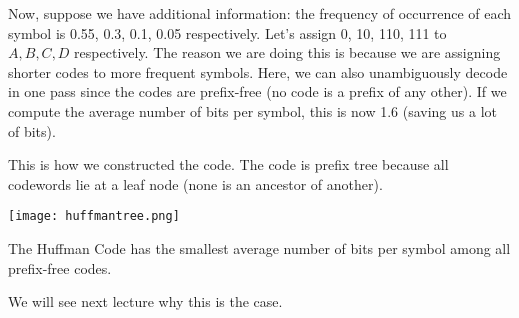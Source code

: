 Now, suppose we have additional information: the frequency of occurrence of each symbol is
0.55, 0.3, 0.1, 0.05 respectively. Let's assign 0, 10, 110, 111 to $A, B, C, D$ respectively.
The reason we are doing this is because we are assigning shorter codes to more frequent symbols.
Here, we can also unambiguously decode in one pass since the codes are prefix-free (no code is a prefix of
any other). If we compute the average number of bits per symbol, this is now 1.6 (saving us a lot of bits).

This is how we constructed the code. The code is prefix tree because all codewords lie at a leaf node (none is an ancestor of another).

\texttt{[image: huffmantree.png]}

\begin{theorem}
    The Huffman Code has the smallest average number of bits per symbol among all prefix-free codes.
\end{theorem}

We will see next lecture why this is the case.